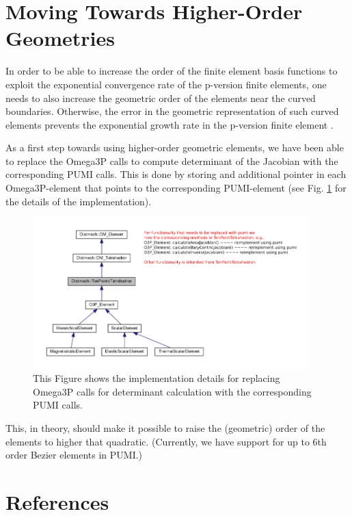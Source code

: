 \documentclass[review,12pt]{elsarticle_summary_report}
\begin{document}
\section{\label{high_order_geom}Moving Towards Higher-Order Geometries}

In order to be able to increase the order of the finite element basis functions to exploit the exponential convergence rate of the p-version finite elements, one needs to also increase the geometric order of the elements near the curved boundaries. Otherwise, the error in the geometric representation of such curved elements prevents the exponential growth rate in the p-version finite element \cite{LuoShephard_04, DeyShephard_97, LuoShephard_02}.

As a first step towards using higher-order geometric elements, we have been able to replace the Omega3P calls to compute determinant of the Jacobian with the corresponding PUMI calls. This is done by storing and additional pointer in each Omega3P-element that points to the corresponding  PUMI-element (see Fig. \ref{imp} for the details of the implementation).
\begin{figure}[ph!]
\centering
\includegraphics[width=0.95\textwidth]{hide_ten_point_tet.png}
\caption{\label{imp} This Figure shows the implementation details for replacing Omega3P calls for determinant calculation with the corresponding PUMI calls.}
\end{figure}
This, in theory, should make it possible to raise the (geometric) order of the elements to higher that quadratic. (Currently, we have support for up to 6th order Bezier elements in PUMI.)


\section*{References}
% 


\end{document}
